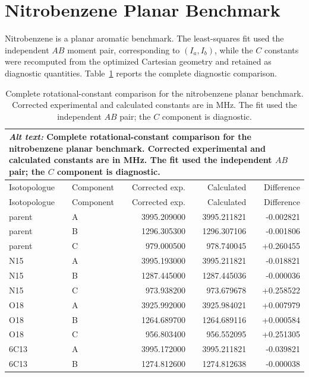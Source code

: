 \documentclass[12pt]{article}
\begin{document}


\section{Nitrobenzene Planar Benchmark}

Nitrobenzene is a planar aromatic benchmark. The least-squares fit used the
independent $AB$ moment pair, corresponding to $(I_a,I_b)$, while the $C$
constants were recomputed from the optimized Cartesian geometry and retained as
diagnostic quantities. Table~\ref{tab:si-nitrobenzene-rotconstants} reports the
complete diagnostic comparison.

\begin{longtable}{llrrr}
\caption{Complete rotational-constant comparison for the nitrobenzene planar benchmark. Corrected experimental and calculated constants are in MHz. The fit used the independent $AB$ pair; the $C$ component is diagnostic.}\label{tab:si-nitrobenzene-rotconstants}\\
\multicolumn{5}{p{0.98\linewidth}}{\textit{Alt text:} Complete rotational-constant comparison for the nitrobenzene planar benchmark. Corrected experimental and calculated constants are in MHz. The fit used the independent $AB$ pair; the $C$ component is diagnostic.}\\
\toprule
Isotopologue & Component & Corrected exp. & Calculated & Difference \\
\midrule
\endfirsthead
\toprule
Isotopologue & Component & Corrected exp. & Calculated & Difference \\
\midrule
\endhead
parent & A & 3995.209000 & 3995.211821 & -0.002821 \\
parent & B & 1296.305300 & 1296.307106 & -0.001806 \\
parent & C & 979.000500 & 978.740045 & +0.260455 \\
N15 & A & 3995.193000 & 3995.211821 & -0.018821 \\
N15 & B & 1287.445000 & 1287.445036 & -0.000036 \\
N15 & C & 973.938200 & 973.679678 & +0.258522 \\
O18 & A & 3925.992000 & 3925.984021 & +0.007979 \\
O18 & B & 1264.689700 & 1264.689116 & +0.000584 \\
O18 & C & 956.803400 & 956.552095 & +0.251305 \\
6C13 & A & 3995.172000 & 3995.211821 & -0.039821 \\
6C13 & B & 1274.812600 & 1274.812638 & -0.000038 \\

\end{longtable}
\end{document}
